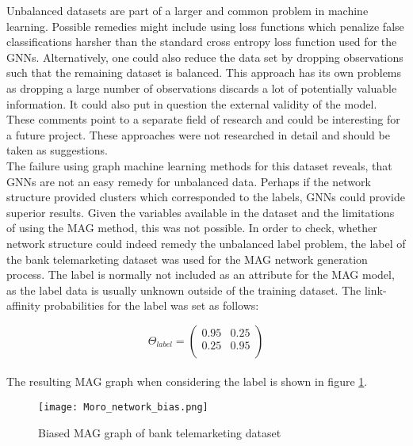   \noindent Unbalanced datasets are part of a larger and common problem in 
  machine learning. Possible remedies might include using loss functions which 
  penalize false classifications harsher than the standard cross entropy loss 
  function used for the GNNs. Alternatively, one could also reduce the data set 
  by dropping observations such that the remaining dataset is balanced. This 
  approach has its own problems as dropping a large number of observations 
  discards a lot of potentially valuable information. It could also put in 
  question the external validity of the model. These comments point to a 
  separate field of research and could be interesting for a future project. 
  These approaches were not researched in detail and should be taken as 
  suggestions. \\

  \noindent The failure using graph machine learning methods for this dataset
  reveals, that GNNs are not an easy remedy for unbalanced data. Perhaps if the
  network structure provided clusters which corresponded to the labels, GNNs
  could provide superior results. Given the variables available in the dataset
  and the limitations of using the MAG method, this was not possible. In order
  to check, whether network structure could indeed remedy the unbalanced label
  problem, the label of the bank telemarketing dataset was used for the MAG 
  network generation process. The label is normally not included as an
  attribute for the MAG model, as the label data is usually unknown outside of
  the training dataset. The link-affinity probabilities for the label was set
  as follows:

  \[ \Theta_{label} = 
	\begin{pmatrix}
        0.95 & 0.25 \\
		0.25 & 0.95 \\
	\end{pmatrix}
	\] \\
  
  \noindent The resulting MAG graph when considering the label is shown in figure
  \ref{fig:Moro_bias}.

  \begin{figure}[h]
		\centering
		\texttt{[image: Moro\_network\_bias.png]}
		\caption{Biased MAG graph of bank telemarketing dataset}
        \label{fig:Moro_bias}
  \end{figure}

